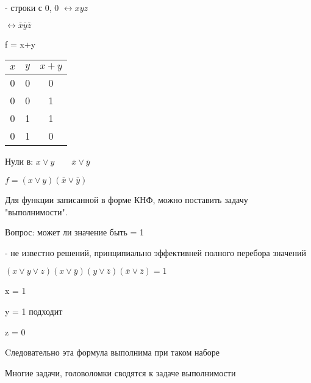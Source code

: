 \documentclass[russian]{lecture-notes}
\begin{document}
    - строки с 0, 0 $\leftrightarrow xyz$

    \qquad \qquad {} $\leftrightarrow \bar{x}\bar{y}\bar{z}$

    \begin{example}
        f = x+y

        \begin{table}[h!]
            \centering
            \begin{tabular}{|c|c|c|}
                \hline
                $x$ & $y$ & $x+y$ \\ \hline
                0     & 0   & 0     \\ \hline
                0     & 0   & 1     \\ \hline
                0     & 1   & 1     \\ \hline
                0     & 1   & 0     \\ \hline
            \end{tabular}
        \end{table}


        Нули в: $x \lor y \qquad \bar{x} \lor \bar{y}$

        $f = (x\lor y)(\bar{x} \lor \bar{y})$


    \end{example}

    \begin{remark}
        Для функции записанной в форме КНФ, можно поставить задачу "выполнимости".

        Вопрос: может ли значение быть = 1

        - не известно решений, принципиально эффективней полного перебора значений

    \end{remark}

    \begin{example}
        $(x \lor y \lor z)(x \lor \bar{y})(y \lor \bar{z})(\bar{x} \lor \bar{z}) = 1$

        x = 1

        y = 1 \qquad подходит

        z = 0

        Cледовательно эта формула выполнима при таком наборе


    \end{example}

    Многие задачи, головоломки сводятся к задаче выполнимости
\end{document}

